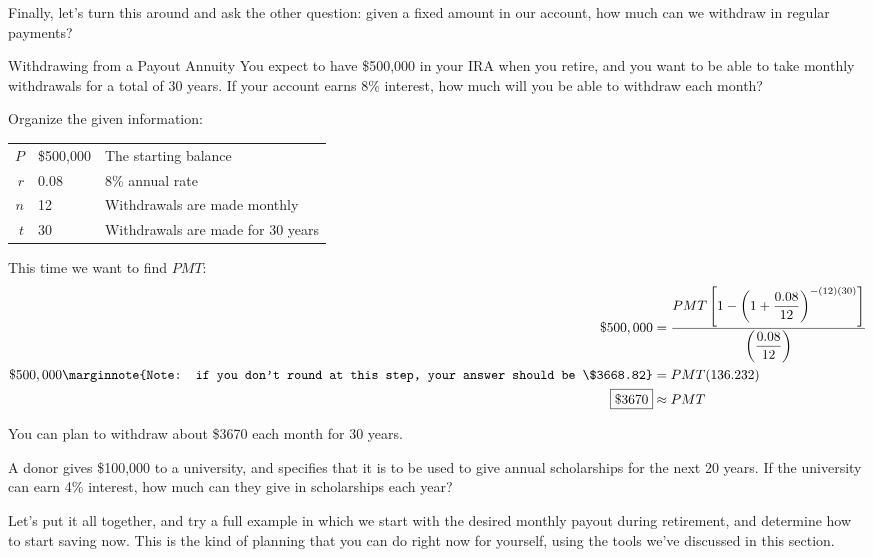 Finally, let's turn this around and ask the other question: given a fixed amount in our account, how much can we withdraw in regular payments?

\begin{example}[https://www.youtube.com/watch?v=BsqVTSoWOm8]{Withdrawing from a Payout Annuity}
You expect to have \$500,000 in your IRA when you retire, and you want to be able to take monthly withdrawals for a total of 30 years.  If your account earns 8\% interest, how much will you be able to withdraw each month?

\sol
Organize the given information:
\begin{center}
\begin{tabular}{r l l}
$P$ & \$500,000 & The starting balance\\
$r$ & 0.08 & 8\% annual rate\\
$n$ & 12 & Withdrawals are made monthly\\
$t$ & 30 & Withdrawals are made for 30 years
\end{tabular}
\end{center}

This time we want to find $PMT$:
\begin{align*}
\$500,000 &= \dfrac{PMT\left[1-\left(1+\dfrac{0.08}{12}\right)^{-(12)(30)}\right]}{\left(\dfrac{0.08}{12}\right)}\\
\$500,000\marginnote{Note: if you don't round at this step, your answer should be \$3668.82} &= PMT(136.232)\\
\boxed{\$3670} &\approx PMT
\end{align*}

You can plan to withdraw about \$3670 each month for 30 years.
\end{example}

\begin{try}
A donor gives \$100,000 to a university, and specifies that it is to be used to give annual scholarships for the next 20 years.  If the university can earn 4\% interest, how much can they give in scholarships each year?
\end{try}
\vfill
\pagebreak

Let's put it all together, and try a full example in which we start with the desired monthly payout during retirement, and determine how to start saving now.  This is the kind of planning that you can do right now for yourself, using the tools we've discussed in this section.

